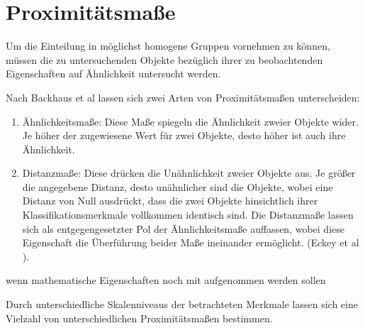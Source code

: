 \chapter{Proximitätsmaße}

Um die Einteilung in möglichst homogene Gruppen vornehmen zu können, müssen die zu untersuchenden Objekte bezüglich ihrer zu beobachtenden Eigenschaften auf Ähnlichkeit untersucht werden. 

Nach Backhaus et al \cite{Backhaus.2016} lassen sich zwei Arten von Proximitätsmaßen unterscheiden:

\begin{enumerate}
	\item Ähnlichkeitsmaße: Diese Maße spiegeln die Ähnlichkeit zweier Objekte wider. Je höher der zugewiesene Wert für zwei Objekte, desto höher ist auch ihre Ähnlichkeit.
	\item Distanzmaße: Diese drücken die Unähnlichkeit zweier Objekte aus. Je größer die angegebene Distanz, desto unähnlicher sind die Objekte, wobei eine Distanz von Null ausdrückt, dass die zwei Objekte hinsichtlich ihrer Klassifikationsmerkmale vollkommen identisch sind. Die Distanzmaße lassen sich als entgegengesetzter Pol der Ähnlichkeitsmaße auffassen, wobei diese Eigenschaft die Überführung beider Maße ineinander ermöglicht. (Eckey et al \cite{Eckey.2002}). 
\end{enumerate}

\cite{Eckey.2002} wenn mathematische Eigenschaften noch mit aufgenommen werden sollen

Durch unterschiedliche Skalenniveaus der betrachteten Merkmale lassen sich eine Vielzahl von unterschiedlichen Proximitätsmaßen bestimmen.